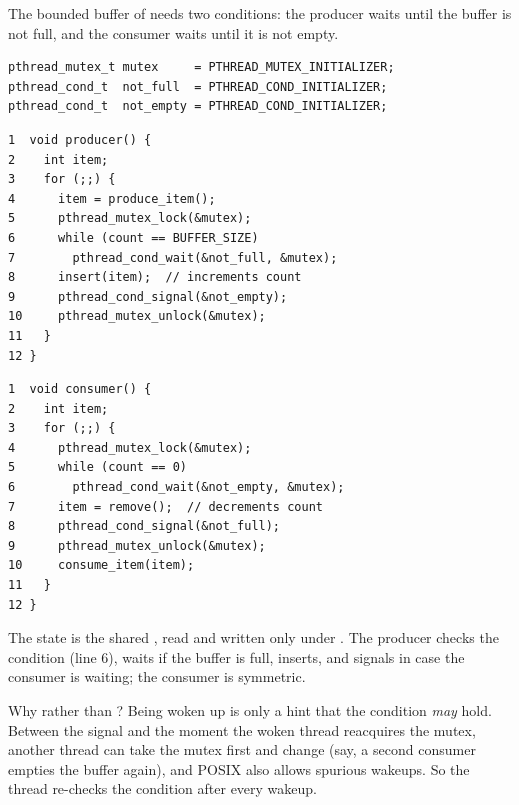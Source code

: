 \begin{example}
  The bounded buffer of  needs two conditions: the producer waits until the buffer is not full, and the consumer waits until it is not empty.
\begin{lstlisting}[basicstyle=\ttfamily\footnotesize, morekeywords={pthread_mutex_t,pthread_cond_t}]
pthread_mutex_t mutex     = PTHREAD_MUTEX_INITIALIZER;
pthread_cond_t  not_full  = PTHREAD_COND_INITIALIZER;
pthread_cond_t  not_empty = PTHREAD_COND_INITIALIZER;
\end{lstlisting}
\begin{center}
\begin{minipage}[t]{0.49\textwidth}
\begin{lstlisting}[basicstyle=\ttfamily\footnotesize]
1  void producer() {
2    int item;
3    for (;;) {
4      item = produce_item();
5      pthread_mutex_lock(&mutex);
6      while (count == BUFFER_SIZE)
7        pthread_cond_wait(&not_full, &mutex);
8      insert(item);  // increments count
9      pthread_cond_signal(&not_empty);
10     pthread_mutex_unlock(&mutex);
11   }
12 }
\end{lstlisting}
\end{minipage}\hfill
\begin{minipage}[t]{0.49\textwidth}
\begin{lstlisting}[basicstyle=\ttfamily\footnotesize]
1  void consumer() {
2    int item;
3    for (;;) {
4      pthread_mutex_lock(&mutex);
5      while (count == 0)
6        pthread_cond_wait(&not_empty, &mutex);
7      item = remove();  // decrements count
8      pthread_cond_signal(&not_full);
9      pthread_mutex_unlock(&mutex);
10     consume_item(item);
11   }
12 }
\end{lstlisting}
\end{minipage}
\end{center}
  The state is the shared , read and written only under . The producer checks the condition (line 6), waits if the buffer is full, inserts, and signals  in case the consumer is waiting; the consumer is symmetric.

  Why  rather than ? Being woken up is only a hint that the condition \emph{may} hold. Between the signal and the moment the woken thread reacquires the mutex, another thread can take the mutex first and change  (say, a second consumer empties the buffer again), and POSIX also allows spurious wakeups. So the thread re-checks the condition after every wakeup.
\end{example}

